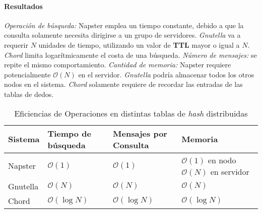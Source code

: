 \paragraph{\textnormal{\textbf{Resultados}}}
\emph{Operación de búsqueda:} Napster emplea un tiempo constante, debido a que la consulta solamente necesita dirigirse a un grupo de servidores. \emph{Gnutella} va a requerir $N$ unidades de tiempo, utilizando un valor de \textbf{TTL} mayor o igual a $N$. \emph{Chord} limita logarítmicamente el costa de una búsqueda. \emph{Número de mensajes:} se repite el mismo comportamiento. \emph{Cantidad de memoria:} Napster requiere potencialmente $\mathcal{O}(N)$ en el servidor. \emph{Gnutella} podría almacenar todos los otros nodos en el sistema. \emph{Chord} solamente requiere de recordar las entradas de las tablas de dedos. 

\begin{table}[h!]
    \centering
     \begin{tabular}{ p{2cm}|p{2cm}|p{2cm}|p{2.5cm}  }
        \toprule[1.5pt]
        Sistema & Tiempo de búsqueda & Mensajes por Consulta & Memoria\\
        \midrule[1.1pt]
        Napster  & $\mathcal{O}(1)$ & $\mathcal{O}(1)$  & $\mathcal{O}(1)$ en nodo $\mathcal{O}(N)$ en servidor\\
        \midrule
        Gnutella & $\mathcal{O}(N)$ & $\mathcal{O}(N)$ & $\mathcal{O}(N)$ \\
        \midrule
        Chord    & $\mathcal{O}(\log N)$ & $\mathcal{O}(\log N)$ & $\mathcal{O}(\log N)$ \\                              
        \bottomrule[1.5pt]
    \end{tabular}
    \caption{Eficiencias de Operaciones en distintas tablas de \emph{hash} distribuidas}
\end{table}

